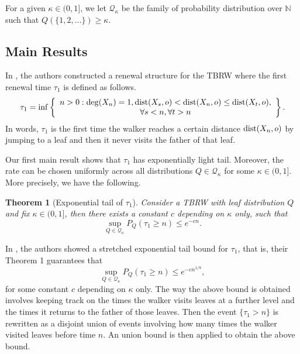 \documentclass[a4paper]{amsart}
\newtheorem{theorem}{Theorem}
\newcommand{\Lbrace}{\left\lbrace}
\newcommand{\Rbrace}{\right\rbrace}
\newcommand{\D}[1]{{\rm dist}(X_{#1},o)}
\newcommand{\Deg}[1]{{\rm deg}(X_{#1})}
\begin{document}
For a given $\kappa \in (0,1]$, we let $\mathcal{Q}_\kappa$ be the family of probability distribution over $\mathbb{N}$ such that $Q(\{1,2,\dots\})\ge \kappa$.

\subsection{Main Results}
In \cite{ribeiro2023}, the authors constructed a renewal structure for the TBRW where the first renewal time $\tau_1$ is defined as follows.
\begin{equation}\label{def:tau1}
    \begin{split}
        \tau_1 =
        \inf \Lbrace
        \begin{array}{c}
            n >0 :\Deg{n} = 1, \D{s} < \D{n} \le \D{t}, \\ 
            \forall s <n, \forall t>n
        \end{array}
        \Rbrace.
    \end{split}
\end{equation}
In words, $\tau_1$ is the first time the walker reaches a certain distance $\D{n}$ by jumping to a leaf and then it never visits the father of that leaf.

Our first main result shows that $\tau_1$ has exponentially light tail. Moreover, the rate can be chosen uniformly across all distributions $Q \in \mathcal{Q}_\kappa$ for some $\kappa \in (0,1]$. More precisely, we have the following.
\begin{theorem}[Exponential tail of $\tau_1$]\label{t:tautail} Consider a TBRW with leaf distribution $Q$ and fix $\kappa\in (0,1]$, then there exists a constant $c$ depending on $\kappa$ only, such that
$$
\sup_{Q \in \mathcal{Q}_\kappa}P_Q(\tau_1 \ge n) \le e^{-cn}.
$$
    
\end{theorem}
In \cite{ribeiro2023}, the authors showed a stretched exponential tail bound for $\tau_1$, that is, their Theorem 1 guarantees that
\begin{equation}\label{eq:stretched}
\sup_{Q\in \mathcal{Q}_\kappa}P_Q(\tau_1 \ge n) \le e^{-cn^{1/8}},    
\end{equation}
for some constant $c$ depending on $\kappa$ only. The way the above bound is obtained involves keeping track on the times the walker visits leaves at a further level and the times it returns to the father of those leaves. Then the event $\{\tau_1 > n\}$ is rewritten as a disjoint union of events involving how many times the walker visited leaves before time $n$. An union bound is then applied to obtain the above bound.
\end{document}
